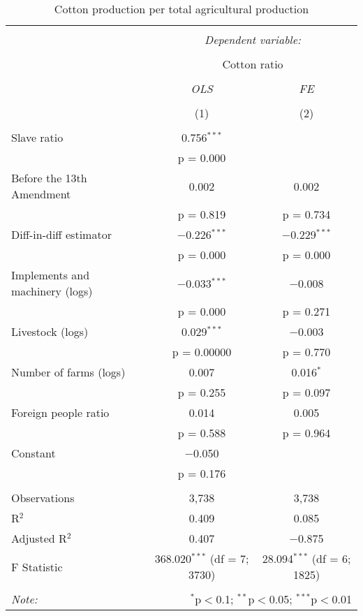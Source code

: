 \documentclass[12pt]{report}
\begin{document}
\begin{table}[!htbp] \centering 
  \caption{Cotton production per total agricultural production} 
  \label{tab:cotnopop} 
\begin{tabular}{@{\extracolsep{5pt}}lcc} 
\\[-1.8ex]\hline 
\hline \\[-1.8ex] 
 & \multicolumn{2}{c}{\textit{Dependent variable:}} \\ 
\cline{2-3} 
\\[-1.8ex] & \multicolumn{2}{c}{Cotton ratio} \\ 
\\[-1.8ex] & \textit{OLS} & \textit{FE} \\  
\\[-1.8ex] & (1) & (2)\\ 
\hline \\[-1.8ex] 
 Slave ratio & 0.756$^{***}$ &  \\ 
  & p = 0.000 &  \\ 
  Before the 13th Amendment & 0.002 & 0.002 \\ 
  & p = 0.819 & p = 0.734 \\ 
  Diff-in-diff estimator & $-$0.226$^{***}$ & $-$0.229$^{***}$ \\ 
  & p = 0.000 & p = 0.000 \\ 
  Implements and machinery (logs) & $-$0.033$^{***}$ & $-$0.008 \\ 
  & p = 0.000 & p = 0.271 \\ 
  Livestock (logs) & 0.029$^{***}$ & $-$0.003 \\ 
  & p = 0.00000 & p = 0.770 \\ 
  Number of farms (logs) & 0.007 & 0.016$^{*}$ \\ 
  & p = 0.255 & p = 0.097 \\ 
  Foreign people ratio & 0.014 & 0.005 \\ 
  & p = 0.588 & p = 0.964 \\ 
  Constant & $-$0.050 &  \\ 
  & p = 0.176 &  \\ 
 \hline \\[-1.8ex] 
Observations & 3,738 & 3,738 \\ 
R$^{2}$ & 0.409 & 0.085 \\ 
Adjusted R$^{2}$ & 0.407 & $-$0.875 \\ 
F Statistic & 368.020$^{***}$ (df = 7; 3730) & 28.094$^{***}$ (df = 6; 1825) \\ 
\hline 
\hline \\[-1.8ex] 
\textit{Note:}  & \multicolumn{2}{r}{$^{*}$p$<$0.1; $^{**}$p$<$0.05; $^{***}$p$<$0.01} \\ 
\end{tabular} 
\end{table} 
\end{document}
